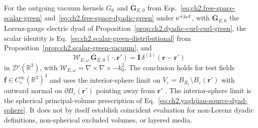 \begin{theorem}
\label{thm:ch2.dyadic-distributional-fundamental}
For the outgoing vacuum kernels $G_0$ and $\overline{\mathbf{G}}_{E,0}$ from
Eqs.~\eqref{eq:ch2.free-space-scalar-green} and~\eqref{eq:ch2.free-space-dyadic-green} under $\mathrm{e}^{+\mathrm{j}\omega t}$,
with $\overline{\mathbf{G}}_{E,0}$ the Lorenz-gauge electric dyad of Proposition~\ref{prop:ch2.dyadic-curl-curl-green},
the scalar identity is Eq.~\eqref{eq:ch2.scalar-green-distributional} from
Proposition~\ref{prop:ch2.scalar-green-vacuum}, and
\begin{equation}
\label{eq:ch2.dyadic-green-distribution}
\mathcal{W}_{E,\omega}\,\overline{\mathbf{G}}_{E,0}(\cdot,\mathbf{r}')
=\overline{\mathbf{I}}\,\delta^{(3)}(\mathbf{r}-\mathbf{r}')
\end{equation}
in $\mathcal{D}'(\mathbb{R}^{3})$, with $\mathcal{W}_{E,\omega}=\nabla\times\nabla\times-k_0^{2}$.
The conclusion holds for test fields $\mathbf{f}\in C_c^{\infty}(\mathbb{R}^{3})^{3}$ and uses the interior-sphere
limit on $V_\varepsilon=B_{R_\varepsilon}\setminus B_\varepsilon(\mathbf{r}')$ with outward normal on
$\partial B_\varepsilon(\mathbf{r}')$ pointing away from $\mathbf{r}'$ \cite{tai1994,stratton1941}.
The interior-sphere limit is the spherical principal-volume prescription of Eq.~\eqref{eq:ch2.yaghjian-source-dyad-sphere}.
It does not by itself establish coincident evaluation for non-Lorenz dyadic definitions, non-spherical excluded volumes, or layered media.
\end{theorem}
